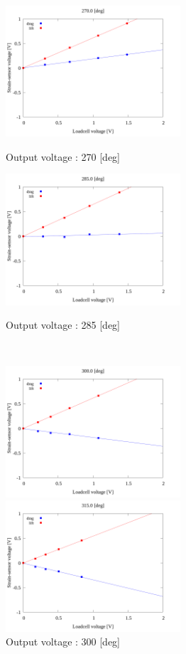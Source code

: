     \begin{figure}
      \begin{minipage}[b]{0.45\linewidth}
        \centering
        \includegraphics[width=65mm]{../../02_workspace/result/2-1/plot/04/04_linear_2700.png}
        \caption{Output voltage : 270 [deg]}
      \end{minipage}
      \begin{minipage}[b]{0.45\linewidth}
        \centering
        \includegraphics[width=65mm]{../../02_workspace/result/2-1/plot/04/04_linear_2850.png}
        \caption{Output voltage : 285 [deg]}
      \end{minipage}\\
      \begin{minipage}[b]{0.45\linewidth}
        \centering
        \includegraphics[width=65mm]{../../02_workspace/result/2-1/plot/04/04_linear_3000.png}
        \caption{Output voltage : 300 [deg]}
      \end{minipage}
      \begin{minipage}[b]{0.45\linewidth}
        \centering
        \includegraphics[width=65mm]{../../02_workspace/result/2-1/plot/04/04_linear_3150.png}

\end{minipage}
\end{figure}

